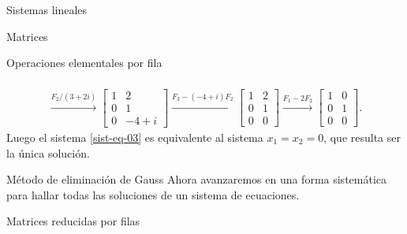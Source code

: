 \begin{chapter}{Sistemas lineales}
\begin{section}{Matrices}
\begin{subsection}{Operaciones elementales por fila}
\begin{ejemplo*}
\begin{multline*}
                    \\
                    \stackrel{F_2/(3+2i)}{\longrightarrow} 
                    \begin{bmatrix} 1&2 \\ 0&1 \\ 0&-4+i \end{bmatrix}
                    \stackrel{F_3-(-4+i)F_2}{\longrightarrow} 
                    \begin{bmatrix} 1&2 \\ 0&1 \\ 0&0 \end{bmatrix}
                    \stackrel{F_1-2F_2}{\longrightarrow} 
                    \begin{bmatrix} 1&0 \\ 0&1 \\ 0&0 \end{bmatrix}.
                    \end{multline*}
                    Luego  el sistema \eqref{sist-eq-03} es equivalente al sistema  $x_1=x_2 = 0$, que resulta ser la única solución.
                \end{ejemplo*}
            \end{subsection} 
        


        
        \end{section}
    
    
    
            \begin{section}{Método de eliminación de Gauss }\label{seccion-metodo-de-gauss} Ahora avanzaremos en una forma sistemática para hallar todas las soluciones de un sistema de ecuaciones.
    
            
            \begin{subsection}{Matrices reducidas por filas} 
                

\end{subsection}
\end{section}
\end{chapter}
